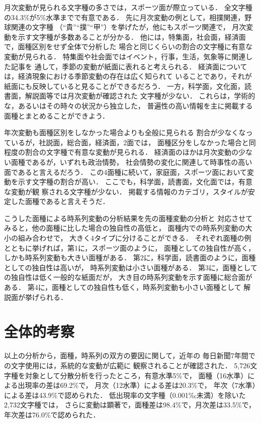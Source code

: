   月次変動が見られる文字種の多さでは，スポーツ面が際立っている．
全文字種の34.3\%が5\%水準までで有意である．
先に月次変動の例として，相撲関連，野球関連の文字種
（“貴”“撲”“甲”）を挙げたが，他にもスポーツ関連で，
月次変動を示す文字種が多数あることが分かる．
他には，特集面，社会面，経済面で，面種区別をせず全体で分析した
場合と同じくらいの割合の文字種に有意な変動が見られる．
特集面や社会面ではイベント，行事，生活，気象等に関連した記事を
通して，季節の変動が紙面に表れると考えられる．
経済面については，経済現象における季節変動の存在は広く知られて
いることであり，それが紙面にも反映していると見ることができるだろう．
一方，科学面，文化面，読書面，解説面等では月次変動が確認された
文字種が少ない．
これらは，学術的な，あるいはその時々の状況から独立した，
普遍性の高い情報を主に掲載する面種とまとめることができよう．

  年次変動も面種区別をしなかった場合よりも全般に見られる
割合が少なくなっているが，社説面，総合面，経済面，2面では，
面種区分をしなかった場合と同程度の割合の文字種で有意な変動が見られる．
経済面のほかは月次変動の少ない面種であるが，いずれも政治情勢，
社会情勢の変化に関連して時事性の高い面であると言えるだろう．
この4面種に続いて，家庭面，スポーツ面において変動を示す文字種の割合が高い．
ここでも，科学面，読書面，文化面では，有意な変動が観
察される文字種が少ない．
掲載する情報のカテゴリ，スタイルが安定した面種であると言えそうだ．

  こうした面種による時系列変動の分析結果を先の面種変動の分析と
対応させてみると，他の面種に比した場合の独自性の高低と，
面種内での時系列変動の大小の組み合わせで，
大きく4タイプに分けることができる．
それぞれ面種の例とともに挙げれば，第1に，スポーツ面のように，
面種としての独自性が高く，しかも時系列変動も大きい面種がある．
第2に，科学面，読書面のように，面種としての独自性は高いが，
時系列変動は小さい面種がある．
第3に，面種としての独自性は低く一般的な紙面だが，
大き目の時系列変動を示す面種に総合面がある．
\hbox{第4}に，面種としての独自性も低く，時系列変動も小さい面種として
解説面が挙げられる．


\section{全体的考察}

  以上の分析から，面種，時系列の双方の要因に関して，近年の
毎日新聞7年間での文字使用には，系統的な変動が広範に
観察されることが確認された．
5,726文字種を対象として分散分析を行ったところ，有意水準5\%で，
面種（16水準）による出現率の差は69.2\%で，
月次（12水準）による差は20.3\%で，
年次（7水準）による差は43.9\%で認められた．
低出現率の文字種（0.001‰未満）を除いた2,732文字種では，
さらに変動は顕著で，面種差は98.4\%で，月次差は33.5\%で，
年次差は76.0\%で認められた．



